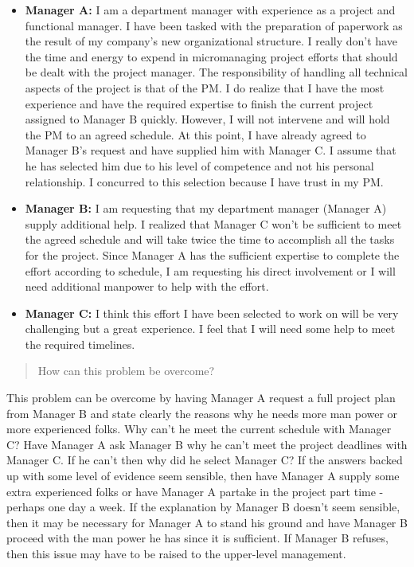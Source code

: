 \documentclass[letterpaper,10pt]{article}
\begin{document}
\begin{itemize}
\item \textbf{Manager A:} I am a department manager with experience as a project and functional manager.  I have been tasked with the preparation of paperwork as the result of my company's new organizational structure.  I really don't have the time and energy to expend in micromanaging project efforts that should be dealt with the project manager.  The responsibility of handling all technical aspects of the project is that of the PM.  I do realize that I have the most experience and have the required expertise to finish the current project assigned to Manager B quickly.   However, I will not intervene and will hold the PM to an agreed schedule.  At this point, I have already agreed to Manager B's request and have supplied him with Manager C.  I assume that he has selected him due to his level of competence and not his personal relationship.  I concurred to this selection because I have trust in my PM.
\item \textbf{Manager B:} I am requesting that my department manager (Manager A) supply additional help.  I realized that Manager C won't be sufficient to meet the agreed schedule and will take twice the time to accomplish all the tasks for the project.  Since Manager A has the sufficient expertise to complete the effort according to schedule, I am requesting his direct involvement or I will need additional manpower to help with the effort.
\item \textbf{Manager C:} I think this effort I have been selected to work on will be very challenging but a great experience.  I feel that I will need some help to meet the required timelines.
\end{itemize}

\begin{quotation}How can this problem be overcome?\end{quotation}

This problem can be overcome by having Manager A request a full project plan from Manager B and state clearly the reasons why he needs more man power or more experienced folks.  Why can't he meet the current schedule with Manager C?  Have Manager A ask Manager B why he can't meet the project deadlines with Manager C.  If he can't then why did he select Manager C?  If the answers backed up with some level of evidence seem sensible, then have Manager A supply some extra experienced folks or have Manager A partake in the project part time - perhaps one day a week.  If the explanation by Manager B doesn't seem sensible, then it may be necessary for Manager A to stand his ground and have Manager B proceed with the man power he has since it is sufficient.  If Manager B refuses, then this issue may have to be raised to the upper-level management.
\end{document}
